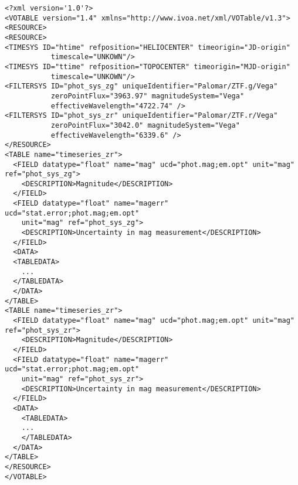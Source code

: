 \begin{verbatim}
<?xml version='1.0'?>
<VOTABLE version="1.4" xmlns="http://www.ivoa.net/xml/VOTable/v1.3">
<RESOURCE>
<RESOURCE>
<TIMESYS ID="htime" refposition="HELIOCENTER" timeorigin="JD-origin" 
           timescale="UNKOWN"/>
<TIMESYS ID="ttime" refposition="TOPOCENTER" timeorigin="MJD-origin" 
           timescale="UNKOWN"/>
<FILTERSYS ID="phot_sys_zg" uniqueIdentifier="Palomar/ZTF.g/Vega" 
           zeroPointFlux="3963.97" magnitudeSystem="Vega" 
           effectiveWavelength="4722.74" />
<FILTERSYS ID="phot_sys_zr" uniqueIdentifier="Palomar/ZTF.r/Vega" 
           zeroPointFlux="3042.0" magnitudeSystem="Vega" 
           effectiveWavelength="6339.6" />
</RESOURCE>
<TABLE name="timeseries_zr">
  <FIELD datatype="float" name="mag" ucd="phot.mag;em.opt" unit="mag" ref="phot_sys_zg">
    <DESCRIPTION>Magnitude</DESCRIPTION>
  </FIELD>
  <FIELD datatype="float" name="magerr" ucd="stat.error;phot.mag;em.opt" 
    unit="mag" ref="phot_sys_zg">
    <DESCRIPTION>Uncertainty in mag measurement</DESCRIPTION>
  </FIELD>
  <DATA>
  <TABLEDATA>
    ...
  </TABLEDATA>
  </DATA>
</TABLE>
<TABLE name="timeseries_zr">
  <FIELD datatype="float" name="mag" ucd="phot.mag;em.opt" unit="mag" ref="phot_sys_zr">
    <DESCRIPTION>Magnitude</DESCRIPTION>
  </FIELD>
  <FIELD datatype="float" name="magerr" ucd="stat.error;phot.mag;em.opt" 
    unit="mag" ref="phot_sys_zr">
    <DESCRIPTION>Uncertainty in mag measurement</DESCRIPTION>
  </FIELD>
  <DATA>
    <TABLEDATA>
    ...
    </TABLEDATA>
  </DATA>
</TABLE>
</RESOURCE>
</VOTABLE>
\end{verbatim}
